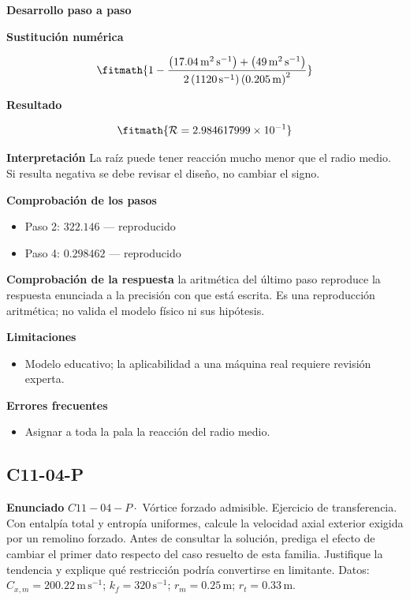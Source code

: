 \documentclass[10pt,openany]{book}
\begin{document}
\noindent\textbf{Desarrollo paso a paso}



\noindent\textbf{Sustitución numérica}

\[
\fitmath{1 - \frac{\left(17.04\,\mathrm{m}^{2}\,\mathrm{s}^{-1}\right) + \left(49\,\mathrm{m}^{2}\,\mathrm{s}^{-1}\right)}{2 \left(1120\,\mathrm{s}^{-1}\right) \left(0.205\,\mathrm{m}\right)^{2}}}
\]

\noindent\textbf{Resultado}

\[
\fitmath{\mathcal R=2.984617999\times10^{-1}}
\]

\noindent\textbf{Interpretación}
La raíz puede tener reacción mucho menor que el radio medio. Si resulta negativa se debe revisar el diseño, no cambiar el signo.

\noindent\textbf{Comprobación de los pasos}
\begin{itemize}
\item Paso 2: $322.146$ — reproducido
\item Paso 4: $0.298462$ — reproducido
\end{itemize}

\noindent\textbf{Comprobación de la respuesta} la aritmética del último paso reproduce la respuesta enunciada a la precisión con que está escrita. Es una reproducción aritmética; no valida el modelo físico ni sus hipótesis.

\noindent\textbf{Limitaciones}
\begin{itemize}
\item Modelo educativo; la aplicabilidad a una máquina real requiere revisión experta.
\end{itemize}

\noindent\textbf{Errores frecuentes}
\begin{itemize}
\item Asignar a toda la pala la reacción del radio medio.
\end{itemize}
\subsection*{C11-04-P}

\noindent\textbf{Enunciado}
\(C11-04-P \cdot\) Vórtice forzado admisible. Ejercicio de transferencia. Con entalpía total y entropía uniformes, calcule la velocidad axial exterior exigida por un remolino forzado. Antes de consultar la solución, prediga el efecto de cambiar el primer dato respecto del caso resuelto de esta familia. Justifique la tendencia y explique qué restricción podría convertirse en limitante. Datos: \(C_{x,m}=200.22\, \mathrm{m}\,\mathrm{s}^{-1}\); \(k_f=320\, \mathrm{s}^{-1}\); \(r_m=0.25\, \mathrm{m}\); \(r_t=0.33\, \mathrm{m}\).
\end{document}
